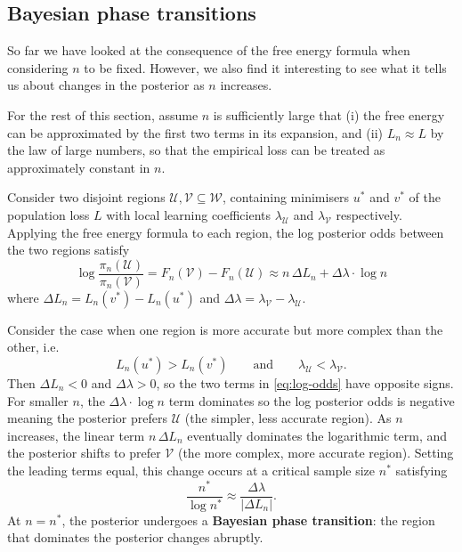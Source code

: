 \documentclass[11pt]{article}
\newcommand{\W}{\mathcal{W}}
\newcommand{\U}{\mathcal{U}}
\newcommand{\V}{\mathcal{V}}
\begin{document}
\subsection{Bayesian phase transitions}

So far we have looked at the consequence of the free energy formula when considering $n$ to be fixed. However, we also find it interesting to see what it tells us about changes in the posterior as $n$ increases. 

For the rest of this section, assume $n$ is sufficiently large that (i) the free energy can be approximated by the first two terms in its expansion, and (ii) $L_n \approx L$ by the law of large numbers, so that the empirical loss can be treated as approximately constant in $n$.

Consider two disjoint regions $\U, \V \subseteq \W$, containing minimisers $u^\ast$ and $v^\ast$ of the population loss $L$ with local learning coefficients $\lambda_{\U}$ and $\lambda_{\V}$ respectively. Applying the free energy formula to each region, the log posterior odds between the two regions satisfy
\begin{equation}
\label{eq:log-odds}
    \log \frac{\pi_n(\U)}{\pi_n(\V)}
    = F_n(\V) - F_n(\U)
    \approx n\,\Delta L_n + \Delta\lambda \cdot \log n
\end{equation}
where $\Delta L_n = L_n(v^\ast) - L_n(u^\ast)$ and $\Delta\lambda = \lambda_{\V} - \lambda_{\U}$.

Consider the case when one region is more accurate but more complex than the other, i.e.
\begin{equation*}
    L_n(u^\ast) > L_n(v^\ast)
    \qquad\text{and}\qquad
    \lambda_{\U} < \lambda_{\V}.
\end{equation*}
Then $\Delta L_n < 0$ and $\Delta\lambda > 0$, so the two terms in \eqref{eq:log-odds} have opposite signs. For smaller $n$, the $\Delta\lambda \cdot \log n$ term dominates so the log posterior odds is negative meaning the posterior prefers $\U$ (the simpler, less accurate region). As $n$ increases, the linear term $n\,\Delta L_n$ eventually dominates the logarithmic term, and the posterior shifts to prefer $\V$ (the more complex, more accurate region). Setting the leading terms equal, this change occurs at a critical sample size $n^*$ satisfying
\begin{equation}
\label{eq:critical-n}
    \frac{n^*}{\log n^*} \approx \frac{\Delta\lambda}{\lvert\Delta L_n\rvert}.
\end{equation}
At $n = n^*$, the posterior undergoes a \textbf{Bayesian phase transition}: the region that dominates the posterior changes abruptly. 
\end{document}
